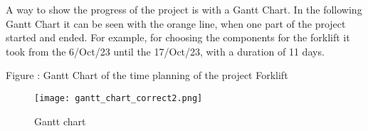 \documentclass[../report.tex]{subfiles}
\begin{document}
    A way to show the progress of the project is with a Gantt Chart. 
    In the following Gantt Chart it can be seen with the orange line, 
    when one part of the project started and ended. For example, for 
    choosing the components for the forklift it took from the 6/Oct/23
     until the 17/Oct/23, with a duration of 11 days.



 Figure : Gantt Chart of the time planning of the project Forklift

 \begin{figure}[h!]
    \centering
    \texttt{[image: gantt\_chart\_correct2.png]}
    \caption{Gantt chart}
 \end{figure}
  
\end{document}
